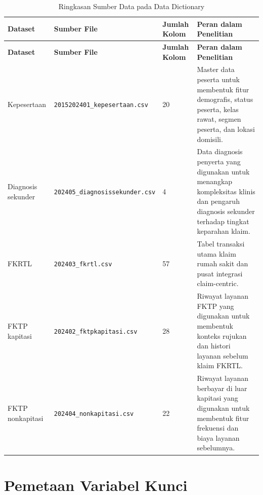 \begin{longtable}[]{@{}p{}p{}p{}p{}@{}}
\caption{Ringkasan Sumber Data pada Data Dictionary}\label{tab:lampiran-sumber-data}\\
\toprule
\textbf{Dataset} & \textbf{Sumber File} & \textbf{Jumlah Kolom} & \textbf{Peran dalam Penelitian} \\
\midrule
\endfirsthead
\toprule
\textbf{Dataset} & \textbf{Sumber File} & \textbf{Jumlah Kolom} & \textbf{Peran dalam Penelitian} \\
\midrule
\endhead
\bottomrule
\endfoot
Kepesertaan & \texttt{2015202401\_kepesertaan.csv} & 20 & Master data peserta untuk membentuk fitur demografis, status peserta, kelas rawat, segmen peserta, dan lokasi domisili. \\
Diagnosis sekunder & \texttt{202405\_diagnosissekunder.csv} & 4 & Data diagnosis penyerta yang digunakan untuk menangkap kompleksitas klinis dan pengaruh diagnosis sekunder terhadap tingkat keparahan klaim. \\
FKRTL & \texttt{202403\_fkrtl.csv} & 57 & Tabel transaksi utama klaim rumah sakit dan pusat integrasi claim-centric. \\
FKTP kapitasi & \texttt{202402\_fktpkapitasi.csv} & 28 & Riwayat layanan FKTP yang digunakan untuk membentuk konteks rujukan dan histori layanan sebelum klaim FKRTL. \\
FKTP nonkapitasi & \texttt{202404\_nonkapitasi.csv} & 22 & Riwayat layanan berbayar di luar kapitasi yang digunakan untuk membentuk fitur frekuensi dan biaya layanan sebelumnya. \\
\end{longtable}

\section{Pemetaan Variabel Kunci}

